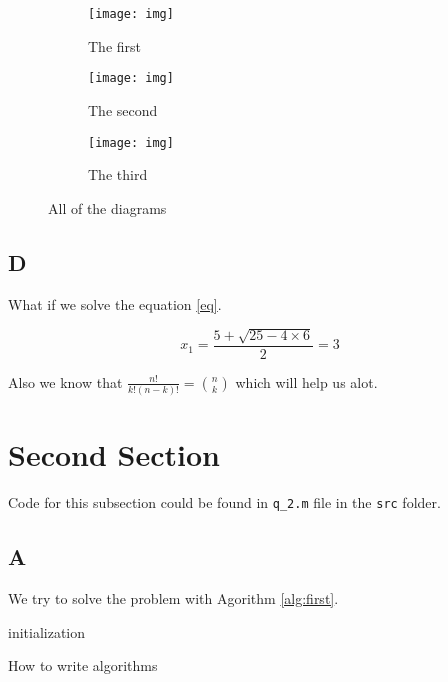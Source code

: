 \documentclass[11pt,a4paper]{article}
\begin{document}
\begin{figure}[!h] %
	\centering
	\begin{subfigure}[h]{0.3\textwidth}
		\texttt{[image: img]}
		\caption{The first}
	\end{subfigure}
	\begin{subfigure}[h]{0.3\textwidth}
		\texttt{[image: img]}
		\caption{The second}
	\end{subfigure}
	\begin{subfigure}[h]{0.3\textwidth}
		\texttt{[image: img]}
		\caption{The third}
	\end{subfigure}

	\caption{All of the diagrams}
	\label{fig:multi}
\end{figure}


\subsection{D}
What if we solve the equation \ref{eq}.

\begin{equation}
\label{eq}
x_1 = \frac{5 + \sqrt{25 - 4 \times 6}}{2} = 3
\end{equation}

Also we know that
$
\frac{n!}{k!(n-k)!} = \binom{n}{k}
$ which will help us alot.

\section{Second Section}

Code for this subsection could be found in \texttt{q\_2.m} file in the \texttt{src} folder.

\subsection{A}
We try to solve the problem with Agorithm \ref{alg:first}.

\begin{algorithm}[H]
	\SetAlgoLined
	initialization\;
	\caption{How to write algorithms}
	\label{alg:first}
\end{algorithm}
\end{document}
